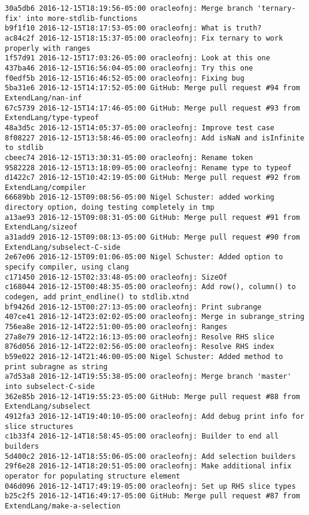 \begin{lstlisting}
30a5db6 2016-12-15T18:19:56-05:00 oracleofnj: Merge branch 'ternary-fix' into more-stdlib-functions
b9f1f10 2016-12-15T18:17:53-05:00 oracleofnj: What is truth?
ac84c2f 2016-12-15T18:15:37-05:00 oracleofnj: Fix ternary to work properly with ranges
1f57d91 2016-12-15T17:03:26-05:00 oracleofnj: Look at this one
437ba46 2016-12-15T16:56:04-05:00 oracleofnj: Try this one
f0edf5b 2016-12-15T16:46:52-05:00 oracleofnj: Fixing bug
5ba31e6 2016-12-15T14:17:52-05:00 GitHub: Merge pull request #94 from ExtendLang/nan-inf
67c5739 2016-12-15T14:17:46-05:00 GitHub: Merge pull request #93 from ExtendLang/type-typeof
48a3d5c 2016-12-15T14:05:37-05:00 oracleofnj: Improve test case
8f08227 2016-12-15T13:58:46-05:00 oracleofnj: Add isNaN and isInfinite to stdlib
cbeec74 2016-12-15T13:30:31-05:00 oracleofnj: Rename token
9582228 2016-12-15T13:18:09-05:00 oracleofnj: Rename type to typeof
d1422c7 2016-12-15T10:42:19-05:00 GitHub: Merge pull request #92 from ExtendLang/compiler
66689bb 2016-12-15T09:08:56-05:00 Nigel Schuster: added working directory option, doing testing completely in tmp
a13ae93 2016-12-15T09:08:31-05:00 GitHub: Merge pull request #91 from ExtendLang/sizeof
a31add9 2016-12-15T09:08:13-05:00 GitHub: Merge pull request #90 from ExtendLang/subselect-C-side
2e67e06 2016-12-15T09:01:06-05:00 Nigel Schuster: Added option to specify compiler, using clang
c171450 2016-12-15T02:33:48-05:00 oracleofnj: SizeOf
c168044 2016-12-15T00:48:35-05:00 oracleofnj: Add row(), column() to codegen, add print_endline() to stdlib.xtnd
bf9426d 2016-12-15T00:27:13-05:00 oracleofnj: Print subrange
407ce41 2016-12-14T23:02:02-05:00 oracleofnj: Merge in subrange_string
756ea8e 2016-12-14T22:51:00-05:00 oracleofnj: Ranges
27a8e79 2016-12-14T22:16:13-05:00 oracleofnj: Resolve RHS slice
876d056 2016-12-14T22:02:56-05:00 oracleofnj: Resolve RHS index
b59e022 2016-12-14T21:46:00-05:00 Nigel Schuster: Added method to print subragne as string
a7d53a8 2016-12-14T19:55:38-05:00 oracleofnj: Merge branch 'master' into subselect-C-side
362e85b 2016-12-14T19:55:23-05:00 GitHub: Merge pull request #88 from ExtendLang/subselect
4912fa3 2016-12-14T19:40:10-05:00 oracleofnj: Add debug print info for slice structures
c1b33f4 2016-12-14T18:58:45-05:00 oracleofnj: Builder to end all builders
5d400c2 2016-12-14T18:55:06-05:00 oracleofnj: Add selection builders
29f6e28 2016-12-14T18:20:51-05:00 oracleofnj: Make additional infix operator for populating structure element
046d096 2016-12-14T17:49:19-05:00 oracleofnj: Set up RHS slice types
b25c2f5 2016-12-14T16:49:17-05:00 GitHub: Merge pull request #87 from ExtendLang/make-a-selection

\end{lstlisting}
